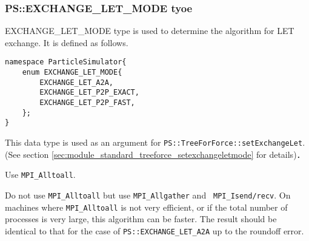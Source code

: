 
\subsubsection{PS::EXCHANGE\_LET\_MODE tyoe}
\label{sec:datatype_enum_exchange_let_mode}



EXCHANGE\_LET\_MODE type is used to determine the algorithm for LET
exchange. It is defined as follows. 


\begin{lstlisting}[caption=EXCHANGE\_LET\_MODE]
namespace ParticleSimulator{
    enum EXCHANGE_LET_MODE{
        EXCHANGE_LET_A2A,
        EXCHANGE_LET_P2P_EXACT,
        EXCHANGE_LET_P2P_FAST,
    };
}
\end{lstlisting}


This data type is used as an argument for {\tt PS::TreeForForce::setExchangeLet}.
(See section \ref{sec:module_standard_treeforce_setexchangeletmode} for details)．




Use {\tt MPI\_Alltoall}.

Do not use {\tt MPI\_Alltoall} but use {\tt MPI\_Allgather} and {\tt
MPI\_Isend/recv}. On machines where {\tt MPI\_Alltoall} is not very
efficient, or if the total number of processes is very large, this
algorithm can be faster. The result should be identical to that for
the case of {\tt PS::EXCHANGE\_LET\_A2A} up to the roundoff error.



